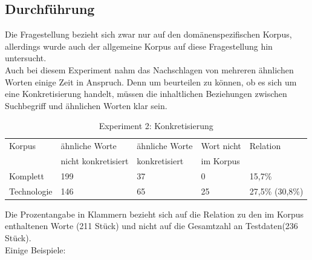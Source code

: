 \documentclass[12pt,a4paper]{report}
\begin{document}
		\subsection{Durchführung}
		Die Fragestellung bezieht sich zwar nur auf den domänenspezifischen Korpus, allerdings wurde auch der allgemeine Korpus auf diese Fragestellung hin untersucht.\\
		Auch bei diesem Experiment nahm das Nachschlagen von mehreren ähnlichen Worten einige Zeit in Anspruch. Denn um beurteilen zu können, ob es sich um eine Konkretisierung handelt, müssen die inhaltlichen Beziehungen zwischen Suchbegriff und ähnlichen Worten klar sein. \\
		
		
\begin{table}[h]
\caption{Experiment 2: Konkretisierung}
\begin{center}
\begin{tabular}{|l||l|l|l|l|}
\hline
Korpus & ähnliche Worte & ähnliche Worte  & Wort nicht  & Relation\\
 & nicht konkretisiert & konkretisiert & im Korpus & \\

\hline
 Komplett & 199 & 37 & 0 & 15,7\% \\
 \hline
 Technologie & 146 & 65 & 25 & 27,5\% (30,8\%)\\
 \hline
 
\end{tabular}
\end{center}
\end{table}
		Die Prozentangabe in Klammern bezieht sich auf die Relation zu den im Korpus enthaltenen Worte (211 Stück) und nicht auf die Gesamtzahl an Testdaten(236 Stück).\\
		
Einige Beispiele:\\
		
\end{document}
